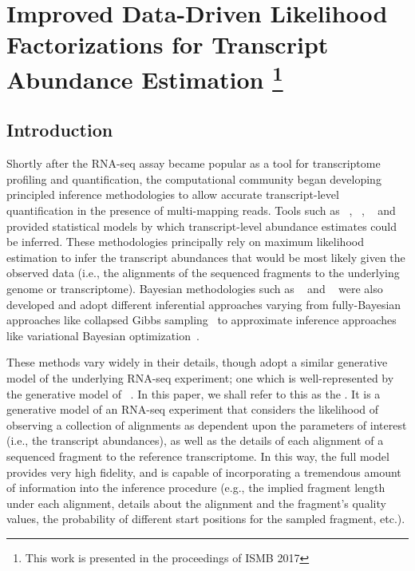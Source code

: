 
\renewcommand{\thechapter}{3}

\chapter[Data-Driven Likelihood Factorizations]{Improved Data-Driven 
Likelihood Factorizations for Transcript Abundance Estimation
\footnote{This work is presented in the proceedings of ISMB 2017}} 
\label{chapt:ddfact}

\section{Introduction}

Shortly after the RNA-seq assay became popular as a tool for transcriptome profiling and 
quantification, the computational community began developing principled inference 
methodologies to allow accurate transcript-level quantification in the presence of 
multi-mapping reads.  Tools such as \cufflinks~\citep{cufflinks}, \rsem~\citep{Li2010RSEM}, 
\mmseq~\citep{Turro2011Haplotype} and \isoem~\citep{Nicolae2011Estimation} provided 
statistical models by which transcript-level abundance estimates could be inferred. 
These methodologies principally rely on maximum likelihood estimation to infer the 
transcript abundances that would be most likely given the observed data (i.e., the 
alignments of the sequenced fragments to the underlying genome or transcriptome). 
Bayesian methodologies such as \bitseq~\citep{bitseq} and \tigar~\citep{tigar} were 
also developed and adopt different inferential approaches varying from fully-Bayesian 
approaches like collapsed Gibbs sampling~\citep{bitseq} to approximate inference 
approaches like variational Bayesian optimization~\citep{tigar,tigar2,bitseqvb}.

These methods vary widely in their details, though adopt a similar 
generative model of the underlying RNA-seq experiment; one which is well-represented 
by the generative model of \rsem~\citep{Li2010RSEM,rsembmc}.  In this paper, we shall 
refer to this as the \fm.  It is a generative model of an RNA-seq experiment that 
considers the likelihood of observing a collection of alignments as dependent upon 
the parameters of interest (i.e., the transcript abundances), as well as the details 
of each alignment of a sequenced fragment to the reference transcriptome.  In this way, 
the full model provides very high fidelity, and is capable of incorporating a tremendous 
amount of information into the inference procedure (e.g., the implied fragment length 
under each alignment, details about the alignment and the fragment's quality values, 
the probability of different start positions for the sampled fragment, etc.).

